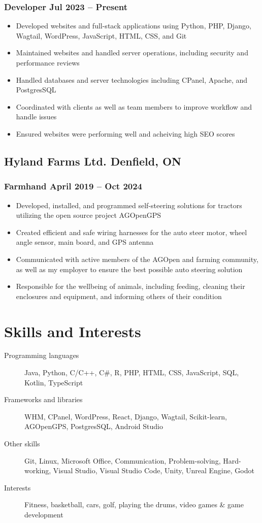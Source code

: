 \documentclass[11pt]{article}
\newcommand{\rside}[1]{
  \hfill {\normalfont\color{accent} #1}%
}
\begin{document}
\subsubsection{Developer \rside{Jul 2023 -- Present}}
\begin{itemize}
  \item Developed websites and full-stack applications using Python, PHP, Django, Wagtail, WordPress, JavaScript, HTML, CSS, and Git
  \item Maintained websites and handled server operations, including security and performance reviews
  \item Handled databases and server technologies including CPanel, Apache, and PostgresSQL
  \item Coordinated with clients as well as team members to improve workflow and handle issues
  \item Ensured websites were performing well and acheiving high SEO scores
\end{itemize}

\subsection{Hyland Farms Ltd. \rside{Denfield, ON}}
\subsubsection{Farmhand \rside{April 2019 -- Oct 2024}}
\begin{itemize}
  \item Developed, installed, and programmed self-steering solutions for tractors utilizing the open source project AGOpenGPS
  \item Created efficient and safe wiring harnesses for the auto steer motor, wheel angle sensor, main board, and GPS antenna
  \item Communicated with active members of the AGOpen and farming community, as well as my employer to ensure the best possible auto steering solution
  \item Responsible for the wellbeing of animals, including feeding, cleaning their enclosures and equipment, and informing others of their condition
\end{itemize}


\section{Skills and Interests}
\begin{description}
  \item[Programming languages] Java, Python, C/C++,  C\#, R, PHP, HTML, CSS, JavaScript, SQL, Kotlin, TypeScript
  \item[Frameworks and libraries] WHM, CPanel, WordPress, React, Django, Wagtail, Scikit-learn, AGOpenGPS, PostgresSQL, Android Studio
  \item[Other skills] Git, Linux, Microsoft Office, Communication, Problem-solving, Hard-working, Visual Studio, Visual Studio Code, Unity, Unreal Engine, Godot
  \item[Interests] Fitness, basketball, cars, golf, playing the drums, video games \& game development 
\end{description}
\end{document}
